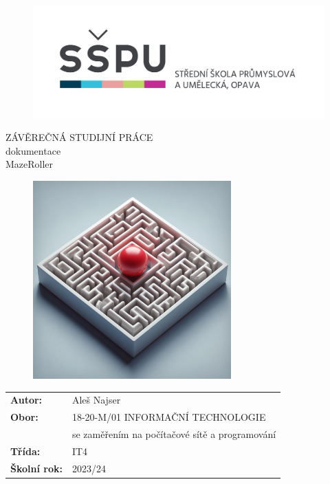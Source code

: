 \documentclass[12pt, a4paper,
twoside        %
]{report}
\title{\nazevPrace} %
\author{\jmenoAutora} %
\date{\datumOdevzdani} %
\newcommand\obor{INFORMAČNÍ TECHNOLOGIE} %
\newcommand\kodOboru{18-20-M/01} %
\newcommand\zamereni{se zaměřením na počítačové sítě a programování} %
\newcommand\trida{IT4} %
\newcommand\jmenoAutora{Aleš Najser}  %
\newcommand\skolniRok{2023/24} %
\newcommand\nazevPrace{MazeRoller} %
\begin{document}
	
	\pagestyle{empty}
	
	\cleardoublepage

	
	{\selectfont
		\begin{figure}[h]
			\centering
			\includegraphics[width=0.6\linewidth]{image/logo-skoly.png} 
		\end{figure}
		
		
		{\bfseries %
			\begin{center}
				\vspace{0.025 \textheight}
				\LARGE{ZÁVĚREČNÁ STUDIJNÍ PRÁCE}\\
				\large{dokumentace}\\
				\vspace{0.075 \textheight}
				\LARGE {\nazevPrace}\\
			\end{center}  
		}%
		
		\begin{figure}[h]
			\centering
			\includegraphics[width=0.8\linewidth, height=3in]{image/mazeroller.jpg} 
		\end{figure}
		
		\vspace{0.02 \textheight}
		\begin{table}[h!]
			\begin{tabular}{ll}
				\textbf{Autor:} & \jmenoAutora\\ 
				\textbf{Obor:} & \kodOboru { } \obor\\
				\textbf{} & \zamereni\\
				\textbf{Třída:} & \trida\\
				\textbf{Školní rok:} & \skolniRok\\
			\end{tabular}
			
		\end{table}		
	}
	
\end{document}
